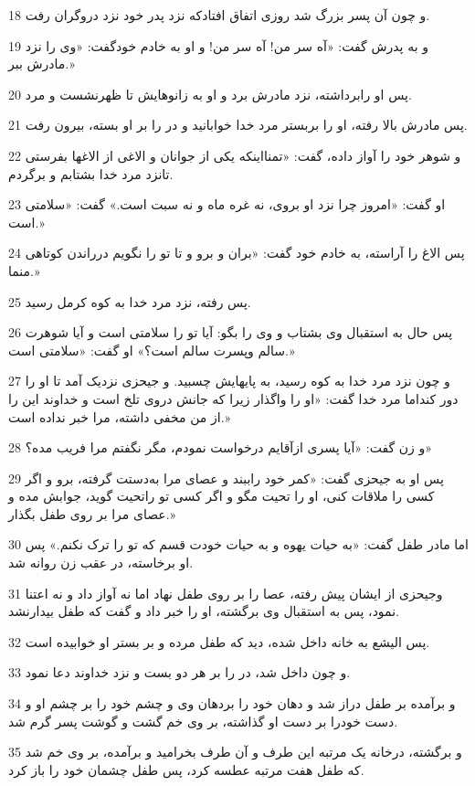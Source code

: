 \par 18 و چون آن پسر بزرگ شد روزی اتفاق افتادکه نزد پدر خود نزد دروگران رفت.
\par 19 و به پدرش گفت: «آه سر من! آه سر من! و او به خادم خودگفت: «وی را نزد مادرش ببر.»
\par 20 پس او رابرداشته، نزد مادرش برد و او به زانوهایش تا ظهرنشست و مرد.
\par 21 پس مادرش بالا رفته، او را بربستر مرد خدا خوابانید و در را بر او بسته، بیرون رفت.
\par 22 و شوهر خود را آواز داده، گفت: «تمنااینکه یکی از جوانان و الاغی از الاغها بفرستی تانزد مرد خدا بشتابم و برگردم.
\par 23 او گفت: «امروز چرا نزد او بروی، نه غره ماه و نه سبت است.» گفت: «سلامتی است.»
\par 24 پس الاغ را آراسته، به خادم خود گفت: «بران و برو و تا تو را نگویم درراندن کوتاهی منما.»
\par 25 پس رفته، نزد مرد خدا به کوه کرمل رسید.
\par 26 پس حال به استقبال وی بشتاب و وی را بگو: آیا تو را سلامتی است و آیا شوهرت سالم وپسرت سالم است؟» او گفت: «سلامتی است.»
\par 27 و چون نزد مرد خدا به کوه رسید، به پایهایش چسبید. و جیحزی نزدیک آمد تا او را دور کنداما مرد خدا گفت: «او را واگذار زیرا که جانش دروی تلخ است و خداوند این را از من مخفی داشته، مرا خبر نداده است.»
\par 28 و زن گفت: «آیا پسری ازآقایم درخواست نمودم، مگر نگفتم مرا فریب مده؟»
\par 29 پس او به جیحزی گفت: «کمر خود راببند و عصای مرا به‌دستت گرفته، برو و اگر کسی را ملاقات کنی، او را تحیت مگو و اگر کسی تو راتحیت گوید، جوابش مده و عصای مرا بر روی طفل بگذار.»
\par 30 اما مادر طفل گفت: «به حیات یهوه و به حیات خودت قسم که تو را ترک نکنم.» پس او برخاسته، در عقب زن روانه شد.
\par 31 وجیحزی از ایشان پیش رفته، عصا را بر روی طفل نهاد اما نه آواز داد و نه اعتنا نمود، پس به استقبال وی برگشته، او را خبر داد و گفت که طفل بیدارنشد.
\par 32 پس الیشع به خانه داخل شده، دید که طفل مرده و بر بستر او خوابیده است.
\par 33 و چون داخل شد، در را بر هر دو بست و نزد خداوند دعا نمود.
\par 34 و برآمده بر طفل دراز شد و دهان خود را بردهان وی و چشم خود را بر چشم او و دست خودرا بر دست او گذاشته، بر وی خم گشت و گوشت پسر گرم شد.
\par 35 و برگشته، درخانه یک مرتبه این طرف و آن طرف بخرامید و برآمده، بر وی خم شد که طفل هفت مرتبه عطسه کرد، پس طفل چشمان خود را باز کرد.
